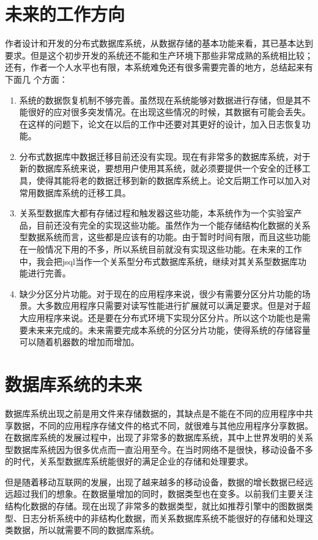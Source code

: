 \section{未来的工作方向}
作者设计和开发的分布式数据库系统，从数据存储的基本功能来看，其已基本达到要求。但是这个初步开发的系统还不能和生产环境下那些非常成熟的系统相比较；
还有，作者一个人水平也有限，本系统难免还有很多需要完善的地方，总结起来有下面几
个方面：

\begin{enumerate}[fullwidth,itemindent=2em]
	\item 系统的数据恢复机制不够完善。虽然现在系统能够对数据进行存储，但是其不能很好的应对很多突发情况。在出现这些情况的时候，其数据有可能会丢失。在这样的问题下，论文在以后的工作中还要对其更好的设计，加入日志恢复功能。
	\item 分布式数据库中数据迁移目前还没有实现。现在有非常多的数据库系统，对于新的数据库系统来说，要想用户使用其系统，就必须要提供一个安全的迁移工具，使得其能将老的数据迁移到新的数据库系统上。论文后期工作可以加入对常用数据库系统的迁移工具。
	\item 关系型数据库大都有存储过程和触发器这些功能，本系统作为一个实验室产品，目前还没有完全的实现这些功能。虽然作为一个能存储结构化数据的关系型数据系统而言，这些都是应该有的功能。由于暂时时间有限，而且这些功能在一般情况下用的不多，所以系统目前就没有实现这些功能。在未来的工作中，我会把jsql当作一个关系型分布式数据库系统，继续对其关系型数据库功能进行完善。
	\item 缺少分区分片功能。对于现在的应用程序来说，很少有需要分区分片功能的场景。大多数应用程序只需要对读写性能进行扩展就可以满足要求。但是对于超大应用程序来说。还是要在分布式环境下实现分区分片。所以这个功能也是需要未来来完成的。未来需要完成本系统的分区分片功能，使得系统的存储容量可以随着机器数的增加而增加。
\end{enumerate}
\section{数据库系统的未来}
数据库系统出现之前是用文件来存储数据的，其缺点是不能在不同的应用程序中共享数据，不同的应用程序存储文件的格式不同，就很难与其他应用程序分享数据。
在数据库系统的发展过程中，出现了非常多的数据库系统，其中上世界发明的关系型数据库系统因为很多优点而一直沿用至今。在当时网络不是很快，移动设备不多的时代，关系型数据库系统能很好的满足企业的存储和处理要求。

但是随着移动互联网的发展，出现了越来越多的移动设备，数据的增长数据已经远远超过我们的想象。在数据量增加的同时，数据类型也在变多。以前我们主要关注结构化数据的存储。现在出现了非常多的数据类型，就比如推荐引擎中的图数据类型、日志分析系统中的非结构化数据，而关系数据库系统不能很好的存储和处理这类数据，所以就需要不同的数据库系统。

